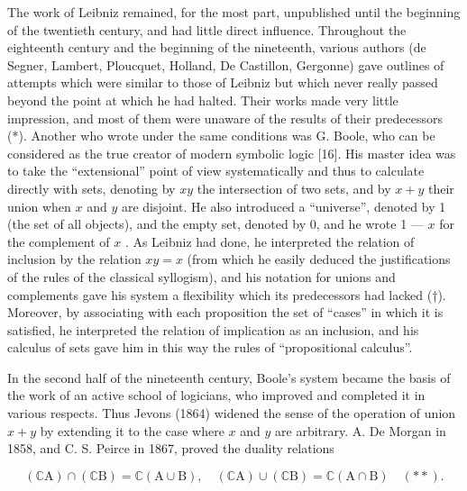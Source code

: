 The work of Leibniz remained, for the most part, unpublished until the beginning of the twentieth century, and had little direct influence. Throughout the eighteenth century and the beginning of the nineteenth, various authors (de Segner, Lambert, Ploucquet, Holland, De Castillon, Gergonne) gave outlines of attempts which were similar to those of Leibniz but which never really passed beyond the point at which he had halted. Their works made very little impression, and most of them were unaware of the results of their predecessors (*). Another who wrote under the same conditions was G. Boole, who can be considered as the true creator of modern symbolic logic {[}16{]}. His master idea was to take the ``extensional'' point of view systematically and thus to calculate directly with sets, denoting by \(xy\) the intersection of two sets, and by \(x + y\) their union when \(x\) and \(y\) are disjoint. He also introduced a ``universe'', denoted by 1 (the set of all objects), and the empty set, denoted by 0, and he wrote 1 --- \(x\) for the complement of \(x\) . As Leibniz had done, he interpreted the relation of inclusion by the relation \(xy = x\) (from which he easily deduced the justifications of the rules of the classical syllogism), and his notation for unions and complements gave his system a flexibility which its predecessors had lacked (†). Moreover, by associating with each proposition the set of ``cases'' in which it is satisfied, he interpreted the relation of implication as an inclusion, and his calculus of sets gave him in this way the rules of ``propositional calculus''.

In the second half of the nineteenth century, Boole's system became the basis of the work of an active school of logicians, who improved and completed it in various respects. Thus Jevons (1864) widened the sense of the operation of union \(x + y\) by extending it to the case where \(x\) and \(y\) are arbitrary. A. De Morgan in 1858, and C. S. Peirce in 1867, proved the duality relations

\[
\left(\mathbb {C} \mathrm{A}\right) \cap \left(\mathbb {C} \mathrm{B}\right) = \mathbb {C} (\mathrm{A} \cup \mathrm{B}), \quad \left(\mathbb {C} \mathrm{A}\right) \cup \left(\mathbb {C} \mathrm{B}\right) = \mathbb {C} (\mathrm{A} \cap \mathrm{B}) \quad (* *).
\]

